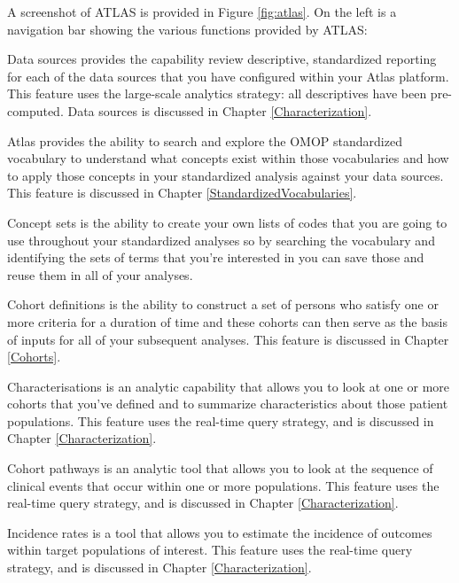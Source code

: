\documentclass[11pt]{book}
\providecommand{\tightlist}{%
  \setlength{\itemsep}{0pt}\setlength{\parskip}{0pt}}
\begin{document}
A screenshot of ATLAS is provided in Figure \ref{fig:atlas}. On the left
is a navigation bar showing the various functions provided by ATLAS:

\begin{description}
\tightlist
\item[Data Sources]
Data sources provides the capability review descriptive, standardized
reporting for each of the data sources that you have configured within
your Atlas platform. This feature uses the large-scale analytics
strategy: all descriptives have been pre-computed. Data sources is
discussed in Chapter \ref{Characterization}.
\item[Vocabulary Search]
Atlas provides the ability to search and explore the OMOP standardized
vocabulary to understand what concepts exist within those vocabularies
and how to apply those concepts in your standardized analysis against
your data sources. This feature is discussed in Chapter
\ref{StandardizedVocabularies}.
\item[Concept Sets]
Concept sets is the ability to create your own lists of codes that you
are going to use throughout your standardized analyses so by searching
the vocabulary and identifying the sets of terms that you're interested
in you can save those and reuse them in all of your analyses.
\item[Cohort Definitions]
Cohort definitions is the ability to construct a set of persons who
satisfy one or more criteria for a duration of time and these cohorts
can then serve as the basis of inputs for all of your subsequent
analyses. This feature is discussed in Chapter \ref{Cohorts}.
\item[Characterizations]
Characterisations is an analytic capability that allows you to look at
one or more cohorts that you've defined and to summarize characteristics
about those patient populations. This feature uses the real-time query
strategy, and is discussed in Chapter \ref{Characterization}.
\item[Cohort Pathways]
Cohort pathways is an analytic tool that allows you to look at the
sequence of clinical events that occur within one or more populations.
This feature uses the real-time query strategy, and is discussed in
Chapter \ref{Characterization}.
\item[Incidence Rates]
Incidence rates is a tool that allows you to estimate the incidence of
outcomes within target populations of interest. This feature uses the
real-time query strategy, and is discussed in Chapter
\ref{Characterization}.
\item[Profiles]

\end{description}
\end{document}
